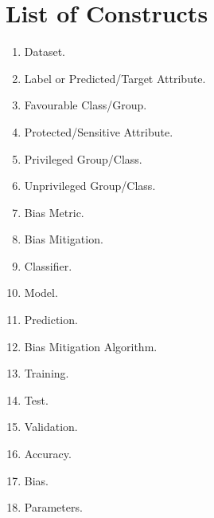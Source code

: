 \documentclass[sigconf,review]{acmart}
\begin{document}
\section{List of Constructs}
\label{sec:list_of_constructs}



\begin{enumerate}
	\item Dataset.
	\item Label or Predicted/Target Attribute.
	\item Favourable Class/Group.
	\item Protected/Sensitive Attribute.
	\item Privileged Group/Class.
	\item Unprivileged Group/Class.
	\item Bias Metric.
	\item Bias Mitigation.
	\item Classifier.
	\item Model.
	\item Prediction.
	\item Bias Mitigation Algorithm.
	\item Training.
	\item Test.
	\item Validation.
	\item Accuracy.
	\item Bias.
	\item Parameters.
\end{enumerate}

   

\end{document}
